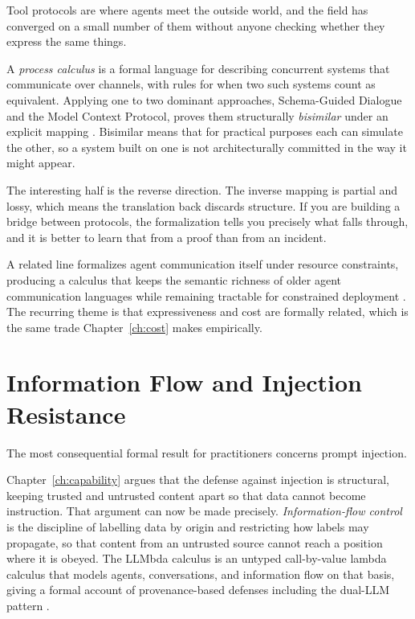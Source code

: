 Tool protocols are where agents meet the outside world, and the field has
converged on a small number of them without anyone checking whether they express
the same things.

A \emph{process calculus} is a formal language for describing concurrent systems that communicate over channels, with rules for when two such systems count as equivalent. Applying one to two dominant approaches, Schema-Guided Dialogue and the Model Context Protocol, proves them structurally \emph{bisimilar} under an explicit mapping \cite{toolcalculus2026}. Bisimilar means that for practical
purposes each can simulate the other, so a system built on one is not
architecturally committed in the way it might appear.

The interesting half is the reverse direction. The inverse mapping is partial and
lossy, which means the translation back discards structure. If you are building a
bridge between protocols, the formalization tells you precisely what falls
through, and it is better to learn that from a proof than from an incident.

A related line formalizes agent communication itself under resource constraints,
producing a calculus that keeps the semantic richness of older agent
communication languages while remaining tractable for constrained deployment
\cite{uacp2026}. The recurring theme is that expressiveness and cost are formally
related, which is the same trade Chapter~\ref{ch:cost} makes empirically.

\section{Information Flow and Injection Resistance}

The most consequential formal result for practitioners concerns prompt injection.

Chapter~\ref{ch:capability} argues that the defense against injection is
structural, keeping trusted and untrusted content apart so that data cannot
become instruction. That argument can now be made precisely. \emph{Information-flow control} is the discipline of labelling data by origin and restricting how labels may propagate, so that content from an untrusted source cannot reach a position where it is obeyed. The LLMbda calculus is an untyped call-by-value lambda calculus that models agents, conversations, and information flow on that basis, giving a formal account of provenance-based defenses including the dual-LLM pattern \cite{llmbda2026}.

